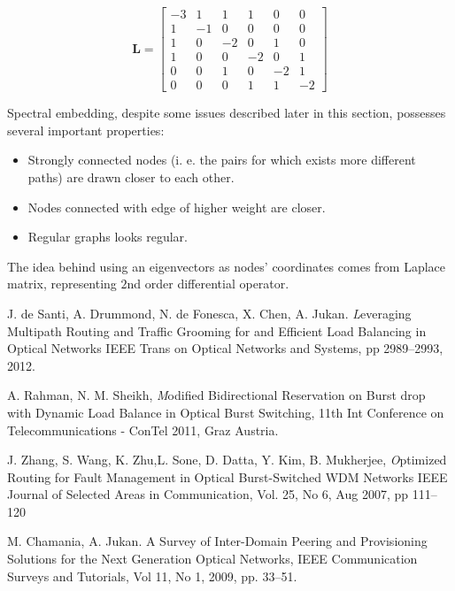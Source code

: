 \documentclass{IEEEtran}
\begin{document}
\begin{equation}
  \label{laplacian}
\mathbf{L}=\left[
\begin{matrix}
-3 & 1 & 1 & 1 & 0 & 0 \\
 1 &-1 & 0 & 0 & 0 & 0 \\
 1 & 0 &-2 & 0 & 1 & 0 \\
 1 & 0 & 0 &-2 & 0 & 1 \\
 0 & 0 & 1 & 0 &-2 & 1 \\
 0 & 0 & 0 & 1 & 1 & -2
\end{matrix}
\right]  
\end{equation}



Spectral embedding, despite some issues described later in this section, possesses
several important properties:
\begin{itemize}
\item Strongly connected nodes (i. e. the pairs for which exists more different 
paths) are drawn closer to each other. 
\item Nodes connected with edge of higher weight are closer.
\item Regular graphs looks regular. 
\end{itemize}
The idea behind using an eigenvectors as nodes' coordinates comes from 
Laplace matrix, representing $2$nd order differential operator.



\begin{thebibliography}{9}
J. de Santi, A. Drummond, N. de Fonesca, X. Chen, A. Jukan. 
{\emph Leveraging Multipath Routing and Traffic Grooming for and Efficient Load Balancing in Optical Networks}
IEEE Trans on Optical Networks and Systems, pp 2989--2993, 2012.


A. Rahman, N. M. Sheikh, {\emph Modified Bidirectional Reservation on Burst drop with Dynamic Load Balance in Optical Burst Switching},
11th Int Conference on Telecommunications - ConTel 2011, Graz Austria.

J. Zhang, S. Wang, K. Zhu,L. Sone, D. Datta, Y. Kim, B. Mukherjee,
{\emph Optimized Routing for Fault Management in Optical Burst-Switched WDM Networks}
IEEE Journal of Selected Areas in Communication, Vol. 25, No 6, Aug 2007, pp 111--120

M. Chamania, A. Jukan.
A Survey of Inter-Domain Peering and Provisioning Solutions for the Next Generation Optical Networks,
IEEE Communication Surveys and Tutorials, Vol 11, No 1, 2009, pp. 33--51.


\end{thebibliography}
\end{document}
